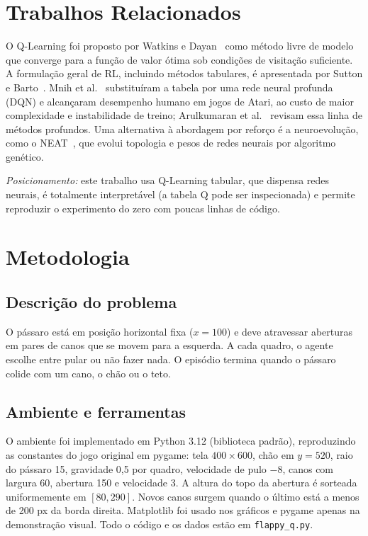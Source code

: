 \documentclass[conference]{IEEEtran}
\begin{document}
\section{Trabalhos Relacionados}
O Q-Learning foi proposto por Watkins e Dayan~\cite{watkins1992} como método livre de modelo que converge para a função de valor ótima sob condições de visitação suficiente. A formulação geral de RL, incluindo métodos tabulares, é apresentada por Sutton e Barto~\cite{sutton2018}. Mnih et al.~\cite{mnih2015} substituíram a tabela por uma rede neural profunda (DQN) e alcançaram desempenho humano em jogos de Atari, ao custo de maior complexidade e instabilidade de treino; Arulkumaran et al.~\cite{arulkumaran2017} revisam essa linha de métodos profundos. Uma alternativa à abordagem por reforço é a neuroevolução, como o NEAT~\cite{stanley2002}, que evolui topologia e pesos de redes neurais por algoritmo genético.

\emph{Posicionamento:} este trabalho usa Q-Learning tabular, que dispensa redes neurais, é totalmente interpretável (a tabela Q pode ser inspecionada) e permite reproduzir o experimento do zero com poucas linhas de código. %

\section{Metodologia}
\subsection{Descrição do problema}
O pássaro está em posição horizontal fixa ($x=100$) e deve atravessar aberturas em pares de canos que se movem para a esquerda. A cada quadro, o agente escolhe entre pular ou não fazer nada. O episódio termina quando o pássaro colide com um cano, o chão ou o teto.

\subsection{Ambiente e ferramentas}
O ambiente foi implementado em Python 3.12 (biblioteca padrão), reproduzindo as constantes do jogo original em pygame: tela $400\times600$, chão em $y=520$, raio do pássaro 15, gravidade 0,5 por quadro, velocidade de pulo $-8$, canos com largura 60, abertura 150 e velocidade 3. A altura do topo da abertura é sorteada uniformemente em $[80, 290]$. Novos canos surgem quando o último está a menos de 200 px da borda direita. Matplotlib foi usado nos gráficos e pygame apenas na demonstração visual. Todo o código e os dados estão em \texttt{flappy\_q.py}.
\end{document}
